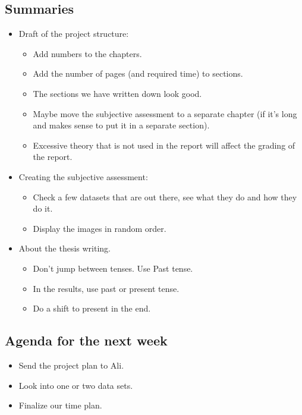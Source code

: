 \subsection*{Summaries}
\begin{itemize}
    \item Draft of the project structure:
    \begin{itemize}
        \item Add numbers to the chapters.
        \item Add the number of pages (and required time) to sections.
        \item The sections we have written down look good.
        \item Maybe move the subjective assessment to a separate chapter (if it’s long and makes sense to put it in a separate section). 
        \item Excessive theory that is not used in the report will affect the grading of the report.
    \end{itemize}
    \item Creating the subjective assessment:
    \begin{itemize}
        \item Check a few datasets that are out there, see what they do and how they do it.
        \item Display the images in random order.
    \end{itemize}
    \item About the thesis writing.
    \begin{itemize}
        \item Don’t jump between tenses. Use Past tense.
        \item In the results, use past or present tense.
        \item Do a shift to present in the end.
        \end{itemize}
\end{itemize}

\subsection*{Agenda for the next week}
\begin{itemize}
    \item Send the project plan to Ali.
    \item Look into one or two data sets.
    \item Finalize our time plan.
\end{itemize}

